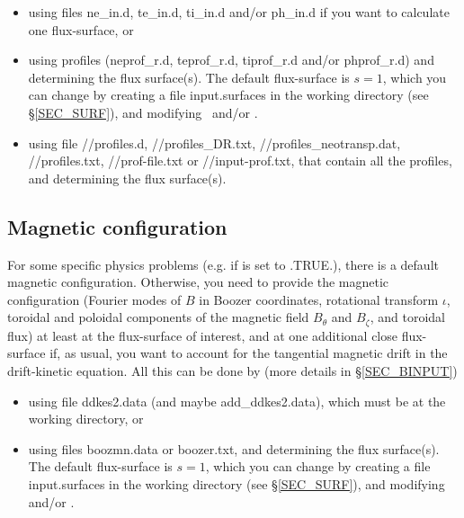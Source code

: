 \begin{itemize} 
\item using files  {\ttfamily ne\_in.d}, {\ttfamily te\_in.d}, {\ttfamily ti\_in.d} and/or {\ttfamily ph\_in.d} if you want to calculate one flux-surface, or
\item using profiles ({\ttfamily neprof\_r.d}, {\ttfamily teprof\_r.d}, {\ttfamily tiprof\_r.d} and/or {\ttfamily phprof\_r.d}) and determining the flux surface(s). The default flux-surface is $s=1$, which you can change by creating a file {\ttfamily input.surfaces} in the working directory (see \S\ref{SEC_SURF}), and modifying~ and/or .
\item using file {\ttfamily //profiles.d}, {\ttfamily //profiles\_DR.txt}, {\ttfamily //profiles\_neotransp.dat}, {\ttfamily //profiles.txt}, {\ttfamily //prof-file.txt} or {\ttfamily //input-prof.txt}, that contain all the profiles, and determining the flux surface(s).
\end{itemize}



\subsection{Magnetic configuration}

For some specific physics problems (e.g. if  is set to {\ttfamily  .TRUE.}), there is a default magnetic configuration. Otherwise, you need to provide the magnetic configuration (Fourier modes of $B$ in Boozer coordinates, rotational transform $\iota$, toroidal and poloidal components of the magnetic field $B_\theta$ and $B_\zeta$, and toroidal flux) at least at the flux-surface of interest, and at one additional close flux-surface if, as usual, you want to account for the tangential magnetic drift in the drift-kinetic equation. All this can be done by (more details in \S\ref{SEC_BINPUT})

\begin{itemize} 
\item using file {\ttfamily ddkes2.data} (and maybe {\ttfamily add\_ddkes2.data}), which must be at the working directory, or
\item using files  {\ttfamily boozmn.data} or {\ttfamily boozer.txt}, and determining the flux surface(s). The default flux-surface is $s=1$, which you can change by creating a file {\ttfamily input.surfaces} in the working directory (see \S\ref{SEC_SURF}), and modifying~ and/or .
\end{itemize}


